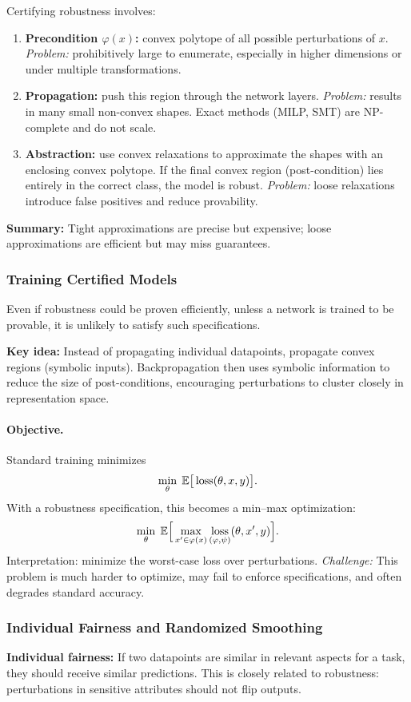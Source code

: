 \documentclass[11pt]{article}
\begin{document}
Certifying robustness involves:
\begin{enumerate}
	\item \textbf{Precondition $\varphi(x)$:} convex polytope of all possible perturbations of $x$.  
	      \emph{Problem:} prohibitively large to enumerate, especially in higher dimensions or under multiple transformations.
	\item \textbf{Propagation:} push this region through the network layers.  
	      \emph{Problem:} results in many small non-convex shapes. Exact methods (MILP, SMT) are NP-complete and do not scale.
	\item \textbf{Abstraction:} use convex relaxations to approximate the shapes with an enclosing convex polytope.  
	      If the final convex region (post-condition) lies entirely in the correct class, the model is robust.  
	      \emph{Problem:} loose relaxations introduce false positives and reduce provability.
\end{enumerate}

\textbf{Summary:} Tight approximations are precise but expensive; loose approximations are efficient but may miss guarantees.

\subsubsection{Training Certified Models}
Even if robustness could be proven efficiently, unless a network is trained to be provable, it is unlikely to satisfy such specifications.

\textbf{Key idea:} Instead of propagating individual datapoints, propagate convex regions (symbolic inputs).  
Backpropagation then uses symbolic information to reduce the size of post-conditions, encouraging perturbations to cluster closely in representation space.

\paragraph{Objective.}  
Standard training minimizes
\[
    \min_\theta \; \mathbb{E} \big[ \operatorname*{loss}(\theta, x, y) \big].
\]
With a robustness specification, this becomes a min–max optimization:
\[
    \min_\theta \; \mathbb{E} \Big[ \max_{x' \in \varphi(x)} \operatorname*{loss}_{(\varphi, \psi)}(\theta, x', y) \Big].
\]
Interpretation: minimize the worst-case loss over perturbations.  
\emph{Challenge:} This problem is much harder to optimize, may fail to enforce specifications, and often degrades standard accuracy.

\subsubsection{Individual Fairness and Randomized Smoothing}
\textbf{Individual fairness:} If two datapoints are similar in relevant aspects for a task, they should receive similar predictions.  
This is closely related to robustness: perturbations in sensitive attributes should not flip outputs.
\end{document}
